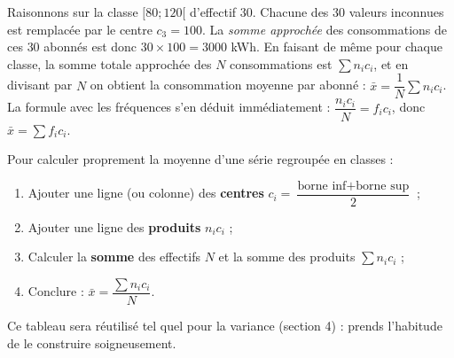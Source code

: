 \documentclass[11pt]{article}
\begin{document}
\begin{experience}
Raisonnons sur la classe $[80;120[$ d'effectif $30$. Chacune des $30$ valeurs inconnues est remplacée par le centre $c_3 = 100$. La \emph{somme approchée} des consommations de ces $30$ abonnés est donc $30 \times 100 = 3000$ kWh. En faisant de même pour chaque classe, la somme totale approchée des $N$ consommations est $\sum n_i c_i$, et en divisant par $N$ on obtient la consommation moyenne par abonné : $\bar{x} = \dfrac{1}{N}\sum n_i c_i$. La formule avec les fréquences s'en déduit immédiatement : $\dfrac{n_i c_i}{N} = f_i c_i$, donc $\bar{x} = \sum f_i c_i$.
\end{experience}

\begin{methode}
Pour calculer proprement la moyenne d'une série regroupée en classes :
\begin{enumerate}
\item Ajouter une ligne (ou colonne) des \textbf{centres} $c_i = \dfrac{\text{borne inf} + \text{borne sup}}{2}$ ;
\item Ajouter une ligne des \textbf{produits} $n_i c_i$ ;
\item Calculer la \textbf{somme} des effectifs $N$ et la somme des produits $\sum n_i c_i$ ;
\item Conclure : $\bar{x} = \dfrac{\sum n_i c_i}{N}$.
\end{enumerate}
Ce tableau sera réutilisé tel quel pour la variance (section 4) : prends l'habitude de le construire soigneusement.
\end{methode}
\end{document}
